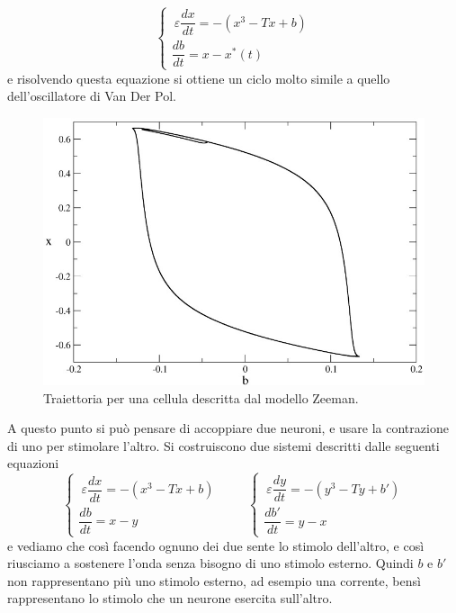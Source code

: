 \documentclass[12pt]{article}
\begin{document}
\begin{equation}
	\begin{cases}
		\ \varepsilon \dfrac{dx}{dt} = -(x^3 - Tx + b) \\
		\dfrac{db}{dt} = x - x^*(t)
	\end{cases}
\end{equation}
e risolvendo questa equazione si ottiene un ciclo molto simile a quello dell'oscillatore di Van Der Pol. 
\begin{figure}[H]
	\centering
	\includegraphics[scale=0.7]{Heartbeat}
	\caption{Traiettoria per una cellula descritta dal modello Zeeman.}
\end{figure}
A questo punto si può pensare di accoppiare due neuroni, e usare la contrazione di uno per stimolare l'altro. Si costruiscono due sistemi descritti dalle seguenti equazioni
\begin{equation}
	\begin{cases}
		\ \varepsilon \dfrac{dx}{dt} = -(x^3 - Tx + b) \\
		\dfrac{db}{dt} = x - y
	\end{cases} \ \ \ \ \ \ \ \ \ \ 
	\begin{cases}
		\ \varepsilon \dfrac{dy}{dt} = -(y^3 - Ty + b') \\
		\dfrac{db'}{dt} = y - x 
	\end{cases}
\end{equation}
e vediamo che così facendo ognuno dei due sente lo stimolo dell'altro, e così riusciamo a sostenere l'onda senza bisogno di uno stimolo esterno. Quindi $b$ e $b'$ non rappresentano più uno stimolo esterno, ad esempio una corrente, bensì rappresentano lo stimolo che un neurone esercita sull'altro. \\
\end{document}
